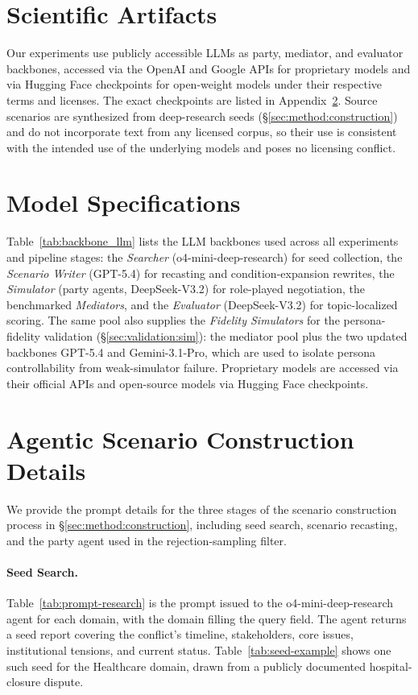 \section{Scientific Artifacts}
Our experiments use publicly accessible LLMs as party, mediator, and evaluator backbones, accessed via the OpenAI and Google APIs for proprietary models and via Hugging Face checkpoints for open-weight models under their respective terms and licenses. The exact checkpoints are listed in Appendix~\ref{app:models}.
%
Source scenarios are synthesized from deep-research seeds (\S\ref{sec:method:construction}) and do not incorporate text from any licensed corpus, so their use is consistent with the intended use of the underlying models and poses no licensing conflict. 

\section{Model Specifications}
\label{app:models}

Table~\ref{tab:backbone_llm} lists the LLM backbones used across all \algname{} experiments and pipeline stages: the \emph{Searcher} (o4-mini-deep-research) for seed collection, the \emph{Scenario Writer} (GPT-5.4) for recasting and condition-expansion rewrites, the \emph{Simulator} (party agents, DeepSeek-V3.2) for role-played negotiation, the benchmarked \emph{Mediators}, and the \emph{Evaluator} (DeepSeek-V3.2) for topic-localized scoring. The same pool also supplies the \emph{Fidelity Simulators} for the persona-fidelity validation (\S\ref{sec:validation:sim}): the mediator pool plus the two updated backbones GPT-5.4 and Gemini-3.1-Pro, which are used to isolate persona controllability from weak-simulator failure. Proprietary models are accessed via their official APIs and open-source models via Hugging Face checkpoints.


\section{Agentic Scenario Construction Details}
\label{app:scenario_detail}

We provide the prompt details for the three stages of the scenario construction process in \S\ref{sec:method:construction}, including seed search, scenario recasting, and the party agent used in the rejection-sampling filter.

\paragraph{Seed Search.}
Table~\ref{tab:prompt-research} is the prompt issued to the o4-mini-deep-research agent for each domain, with the domain filling the query field. The agent returns a seed report covering the conflict's timeline, stakeholders, core issues, institutional tensions, and current status. Table~\ref{tab:seed-example} shows one such seed for the Healthcare domain, drawn from a publicly documented hospital-closure dispute.

